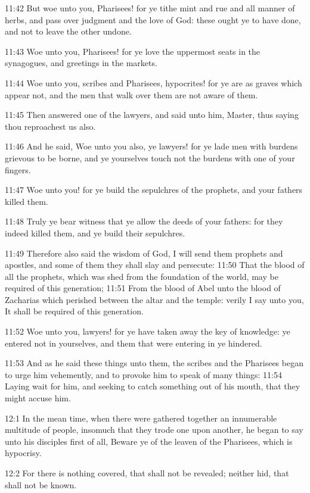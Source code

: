 11:42 But woe unto you, Pharisees! for ye tithe mint and rue and all
manner of herbs, and pass over judgment and the love of God: these
ought ye to have done, and not to leave the other undone.

11:43 Woe unto you, Pharisees! for ye love the uppermost seats in the
synagogues, and greetings in the markets.

11:44 Woe unto you, scribes and Pharisees, hypocrites! for ye are as
graves which appear not, and the men that walk over them are not aware
of them.

11:45 Then answered one of the lawyers, and said unto him, Master,
thus saying thou reproachest us also.

11:46 And he said, Woe unto you also, ye lawyers! for ye lade men with
burdens grievous to be borne, and ye yourselves touch not the burdens
with one of your fingers.

11:47 Woe unto you! for ye build the sepulchres of the prophets, and
your fathers killed them.

11:48 Truly ye bear witness that ye allow the deeds of your fathers:
for they indeed killed them, and ye build their sepulchres.

11:49 Therefore also said the wisdom of God, I will send them prophets
and apostles, and some of them they shall slay and persecute: 11:50
That the blood of all the prophets, which was shed from the foundation
of the world, may be required of this generation; 11:51 From the blood
of Abel unto the blood of Zacharias which perished between the altar
and the temple: verily I say unto you, It shall be required of this
generation.

11:52 Woe unto you, lawyers! for ye have taken away the key of
knowledge: ye entered not in yourselves, and them that were entering
in ye hindered.

11:53 And as he said these things unto them, the scribes and the
Pharisees began to urge him vehemently, and to provoke him to speak of
many things: 11:54 Laying wait for him, and seeking to catch something
out of his mouth, that they might accuse him.

12:1 In the mean time, when there were gathered together an
innumerable multitude of people, insomuch that they trode one upon
another, he began to say unto his disciples first of all, Beware ye of
the leaven of the Pharisees, which is hypocrisy.

12:2 For there is nothing covered, that shall not be revealed; neither
hid, that shall not be known.

